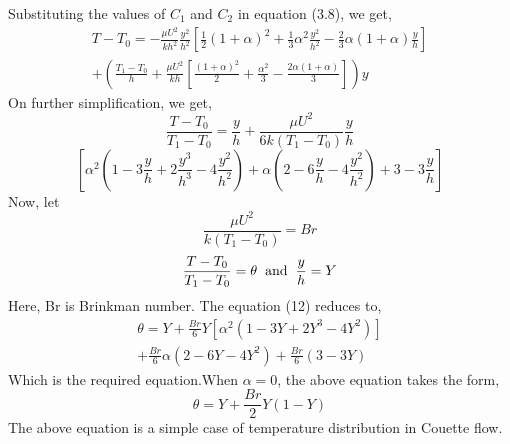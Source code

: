\documentclass[14pt,one side, a4paper]{extbook}
\begin{document}
	 	Substituting the values of $C_{1}$ and $C_{2}$ in equation (3.8), we get,
	 	\begin{multline}
	 		T-T_{0}=-\frac{\mu U^{2}}{kh^{2}}\frac{y^{2}}{h^{2}}\left[\frac{1}{2}(1+\alpha)^{2}+\frac{1}{3}\alpha^{2}\frac{y^{2}}{h^{2}}-\frac{2}{3}\alpha(1+\alpha)\frac{y}{h}\right]\\+\left(\frac{T_{1}-T_{0}}{h}+\frac{\mu U^{2}}{kh}\left[\frac{(1+\alpha)^{2}}{2}+\frac{\alpha^{2}}{3}-\frac{2\alpha(1+\alpha)}{3}\right]\right)y
	 	\end{multline}
	 	On further simplification, we get,
	 	\begin{equation*}
	 		\frac{T-T_{0}}{T_{1}-T_{0}}=\frac{y}{h}+\frac{\mu U^{2}}{6k(T_{1}-T_{0})} \frac{y}{h} 
	 	\end{equation*}
	 	\begin{equation}	
	 	\left[\alpha^{2}\left(1-3\frac{y}{h}+2\frac{y^{3}}{h^{3}}-4\frac{y^{2}}{h^{2}}\right)+\alpha\left(2-6\frac{y}{h}-4\frac{y^{2}}{h^{2}}\right) +3-3\frac{y}{h}\right] 
	 	\end{equation}
	 	Now, let $$\frac{\mu U^{2}}{k(T_{1}-T_{0})}=Br$$
	 		$$\frac{T-T_{0}}{T_{1}-T_{0}}=\theta\hspace*{0.2cm}\textrm{and}\hspace*{0.2cm}\frac{y}{h}=Y$$
	 	Here, Br is Brinkman number.
	 	The equation (12) reduces to,
	 	\begin{multline}
	 		\theta =Y+\frac{Br}{6}Y\left[\alpha^{2}\left(1-3Y+2Y^{3}-4Y^{2}\right)\right] \\+\frac{Br}{6}\alpha\left(2-6Y-4Y^{2}\right) + \frac{Br}{6}\left(3-3Y\right)  
	 	\end{multline}
	 	Which is the required equation.When  $\alpha =0$, the above equation takes the form,
	 	\begin{equation*}
	 		\theta=Y+\frac{Br}{2}Y(1-Y)
	 	\end{equation*}
	 	The above equation is a simple case of temperature distribution in Couette flow.
\end{document}
